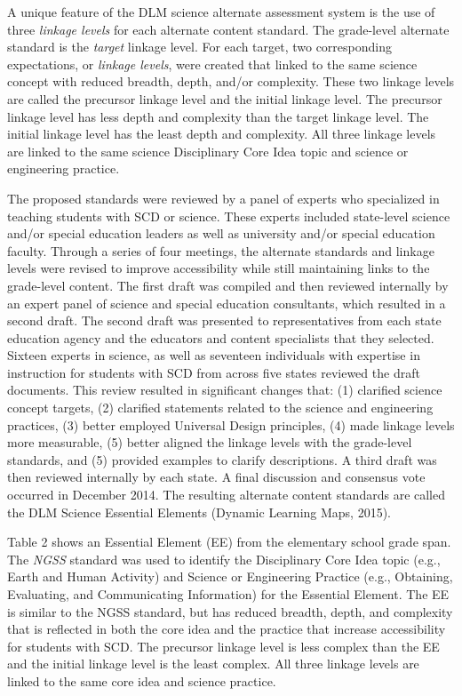\documentclass[11.5pt]{sig-alternate} %
\begin{document}
\begin{large}
A unique feature of the DLM science alternate assessment system is the use of three \textit{linkage levels} for each alternate content standard. The grade-level alternate standard is the \textit{target} linkage level. For each target, two corresponding expectations, or \textit{linkage levels}, were created that linked to the same science concept with reduced breadth, depth, and/or complexity. These two linkage levels are called the precursor linkage level and the initial linkage level. The precursor linkage level has less depth and complexity than the target linkage level. The initial linkage level has the least depth and complexity. All three linkage levels are linked to the same science Disciplinary Core Idea topic and science or engineering practice. 

The proposed standards were reviewed by a panel of experts who specialized in teaching students with SCD or science. These experts included state-level science and/or special education leaders as well as university and/or special education faculty. Through a series of four meetings, the alternate standards and linkage levels were revised to improve accessibility while still maintaining links to the grade-level content. The first draft was compiled and then reviewed internally by an expert panel of science and special education consultants, which resulted in a second draft. The second draft was presented to representatives from each state education agency and the educators and content specialists that they selected. Sixteen experts in science, as well as seventeen individuals with expertise in instruction for students with SCD from across five states reviewed the draft documents. This review resulted in significant changes that: (1) clarified science concept targets, (2) clarified statements related to the science and engineering practices, (3) better employed Universal Design principles, (4) made linkage levels more measurable, (5) better aligned the linkage levels with the grade-level standards, and (5) provided examples to clarify descriptions. A third draft was then reviewed internally by each state. A final discussion and consensus vote occurred in December 2014. The resulting alternate content standards are called the DLM Science Essential Elements (Dynamic Learning Maps, 2015).

Table 2 shows an Essential Element (EE) from the elementary school grade span. The \textit{NGSS} standard was used to identify the Disciplinary Core Idea topic (e.g., Earth and Human Activity) and Science or Engineering Practice (e.g., Obtaining, Evaluating, and Communicating Information) for the Essential Element. The EE is similar to the NGSS standard, but has reduced breadth, depth, and complexity that is reflected in both the core idea and the practice that increase accessibility for students with SCD. The precursor linkage level is less complex than the EE and the initial linkage level is the least complex. All three linkage levels are linked to the same core idea and science practice.


\end{large}
\end{document}
